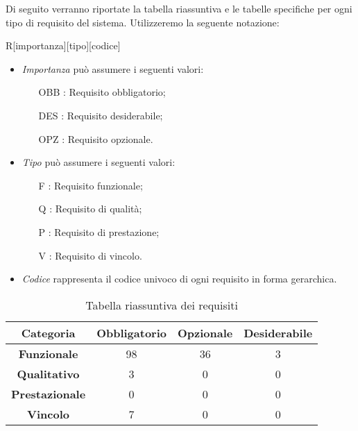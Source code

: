 Di seguito verranno riportate la tabella riassuntiva e le tabelle specifiche per ogni tipo di requisito del sistema. Utilizzeremo la seguente notazione:

R[importanza][tipo][codice]

\begin{itemize}
	\item \textit{Importanza} può assumere i seguenti valori:
	\begin{itemize}
		\item [OBB]: Requisito obbligatorio;
		\item [DES]: Requisito desiderabile;
		\item [OPZ]: Requisito opzionale.
	\end{itemize}
	
	\item \textit{Tipo} può assumere i seguenti valori:
	\begin{itemize}
		\item [F] : Requisito funzionale;
		\item [Q] : Requisito di qualità;
		\item [P] : Requisito di prestazione;
		\item [V] : Requisito di vincolo.
	\end{itemize}
	
	\item \textit{Codice} rappresenta il codice univoco di ogni requisito in forma gerarchica.
\end{itemize}

	\begin{table}[h]
		\centering
		\begin{tabular}{|c|c|c|c|}
			\toprule
			
			\textbf{Categoria} & \textbf{Obbligatorio} & \textbf{Opzionale} & \textbf{Desiderabile} \\
			
			\midrule
			\textbf{Funzionale} & 98 & 36 & 3 \\ \midrule
			\textbf{Qualitativo} & 3 & 0 & 0 \\  \midrule
			\textbf{Prestazionale} & 0 & 0 & 0 \\ \midrule
			\textbf{Vincolo} & 7 & 0 & 0  \\
			
			\bottomrule
			
		\end{tabular}
		\caption{Tabella riassuntiva dei requisiti}
		
	\end{table}
	\newpage


\newpage


\newpage


\newpage


\newpage

%

